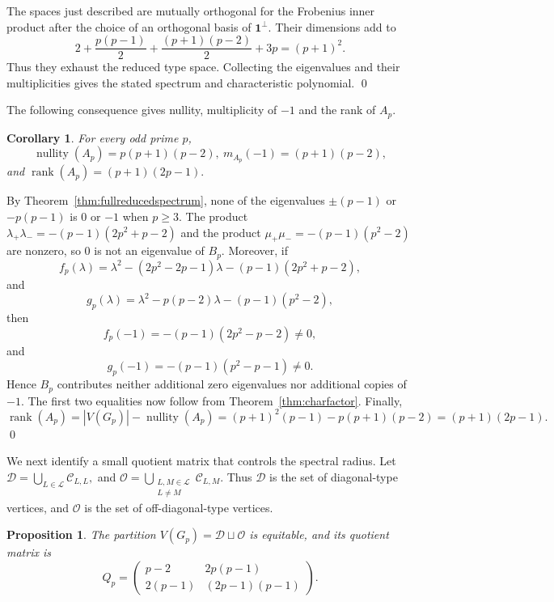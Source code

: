 \documentclass[12pt]{article}
\renewenvironment{proof}{{\bf \noindent Proof.}}{\qed}
\newtheorem{proposition}[theorem]{Proposition}
\newtheorem{corollary}[theorem]{Corollary}
\theoremstyle{definition}
\newcommand{\calL}{\mathcal{L}}
\newcommand{\calD}{\mathcal{D}}
\newcommand{\calO}{\mathcal{O}}
\newcommand{\calC}{\mathcal{C}}
\newcommand{\one}{\mathbf{1}}
\newcommand{\rank}{\operatorname{rank}}
\newcommand{\nullity}{\operatorname{nullity}}
\begin{document}
\begin{proof}
		The spaces just described are mutually orthogonal for the Frobenius inner product after the choice of an orthogonal basis of $\one^{\perp}$. Their dimensions add to
		$$
		2+\frac{p(p-1)}{2}+\frac{(p+1)(p-2)}{2}+3p=(p+1)^2.
		$$
		Thus they exhaust the reduced type space. Collecting the eigenvalues and their multiplicities gives the stated spectrum and characteristic polynomial.
	\end{proof}
	
	\medskip
	The following consequence gives nullity, multiplicity of $-1$ and the rank of $A_{p}.$
	\begin{corollary}\label{cor:exactnullityrank}
		For every odd prime $p$,
		$$
		\nullity(A_p)=p(p+1)(p-2),~
		m_{A_p}(-1)=(p+1)(p-2),
		$$
		and
		$
		\rank(A_p)=(p+1)(2p-1).
		$
	\end{corollary}
	
	\begin{proof}
		By Theorem~\ref{thm:fullreducedspectrum}, none of the eigenvalues $\pm(p-1)$ or $-p(p-1)$ is $0$ or $-1$ when $p\ge3$. The product $\lambda_+\lambda_-=-(p-1)(2p^2+p-2)$ and the product $\mu_+\mu_-=-(p-1)(p^2-2)$ are nonzero, so $0$ is not an eigenvalue of $B_p$. Moreover, if
		$$
		f_p(\lambda)=\lambda^2-(2p^2-2p-1)\lambda-(p-1)(2p^2+p-2),
		$$
		and
		$$
		g_p(\lambda)=\lambda^2-p(p-2)\lambda-(p-1)(p^2-2),
		$$
		then
		$$
		f_p(-1)=-(p-1)(2p^2-p-2)\neq0,
		$$
		and
		$$
		g_p(-1)=-(p-1)(p^2-p-1)\neq0.
		$$
		Hence $B_p$ contributes neither additional zero eigenvalues nor additional copies of $-1$. The first two equalities now follow from Theorem~\ref{thm:charfactor}. Finally,
		$$
		\rank(A_p)=|V(G_p)|-\nullity(A_p)
		=(p+1)^2(p-1)-p(p+1)(p-2)
		=(p+1)(2p-1).
		$$
	\end{proof}
	
	\medskip
	We next identify a small quotient matrix that controls the spectral radius. Let $\calD=\bigcup_{L\in\calL}\calC_{L,L},$ and $	\calO=\bigcup_{\substack{L,M\in\calL\\L\neq M}}\calC_{L,M}.$ Thus $\calD$ is the set of diagonal-type vertices, and $\calO$ is the set of off-diagonal-type vertices.
	
	\begin{proposition}\label{prop:equitable}
		The partition $V(G_p)=\calD\sqcup \calO$ is equitable, and its quotient matrix is
		$$
		Q_p=
		\begin{pmatrix}
			p-2 & 2p(p-1)\\[1mm]
			2(p-1) & (2p-1)(p-1)
		\end{pmatrix}.
		$$
	\end{proposition}
	
\end{document}
